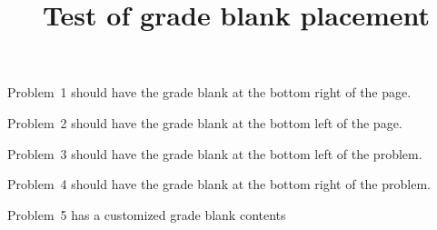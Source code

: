 \documentclass{article}
\title{Test of grade blank placement}
\begin{document}
\pagestyle{plain}
\thispagestyle{plain}
\maketitle

\begin{problem}[points=1,grade blank location=bottom right of page]
Problem~1 should have the grade blank at the bottom right of the page.
\end{problem}

\begin{problem}[points=2,ownpage,grade blank location=bottom left of page]
Problem~2 should have the grade blank at the bottom left of the page.
\end{problem}

\clearpage
\begin{problem}[points=3,grade blank location=bottom left of problem]
Problem~3 should have the grade blank at the bottom left of the problem.
\end{problem}

\begin{problem}[points=4,grade blank location=bottom right of problem]
Problem~4 should have the grade blank at the bottom right of the problem.
\end{problem}

\begin{problem}[points=5,grade blank contents={\rule{0pt}{1cm}\rule{1cm}{0.5pt} // \arabic{probpoints}}]
Problem~5 has a customized grade blank contents
\end{problem}
\end{document}
